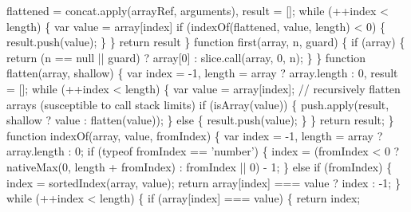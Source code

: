\begin{DoxyCodeInclude}
{{\textcolor{stringliteral}{        flattened = concat.apply(arrayRef, arguments),}
\textcolor{stringliteral}{        result = [];}
\textcolor{stringliteral}{}
\textcolor{stringliteral}{    while (++index < length) \{}
\textcolor{stringliteral}{      var value = array[index]}
\textcolor{stringliteral}{      if (indexOf(flattened, value, length) < 0) \{}
\textcolor{stringliteral}{        result.push(value);}
\textcolor{stringliteral}{      \}}
\textcolor{stringliteral}{    \}}
\textcolor{stringliteral}{    return result}
\textcolor{stringliteral}{  \}}
\textcolor{stringliteral}{}
\textcolor{stringliteral}{  function first(array, n, guard) \{}
\textcolor{stringliteral}{    if (array) \{}
\textcolor{stringliteral}{      return (n == null || guard) ? array[0] : slice.call(array, 0, n);}
\textcolor{stringliteral}{    \}}
\textcolor{stringliteral}{  \}}
\textcolor{stringliteral}{}
\textcolor{stringliteral}{  function flatten(array, shallow) \{}
\textcolor{stringliteral}{    var index = -1,}
\textcolor{stringliteral}{        length = array ? array.length : 0,}
\textcolor{stringliteral}{        result = [];}
\textcolor{stringliteral}{}
\textcolor{stringliteral}{    while (++index < length) \{}
\textcolor{stringliteral}{      var value = array[index];}
\textcolor{stringliteral}{}
\textcolor{stringliteral}{      // recursively flatten arrays (susceptible to call stack limits)}
\textcolor{stringliteral}{      if (isArray(value)) \{}
\textcolor{stringliteral}{        push.apply(result, shallow ? value : flatten(value));}
\textcolor{stringliteral}{      \} else \{}
\textcolor{stringliteral}{        result.push(value);}
\textcolor{stringliteral}{      \}}
\textcolor{stringliteral}{    \}}
\textcolor{stringliteral}{    return result;}
\textcolor{stringliteral}{  \}}
\textcolor{stringliteral}{}
\textcolor{stringliteral}{  function indexOf(array, value, fromIndex) \{}
\textcolor{stringliteral}{    var index = -1,}
\textcolor{stringliteral}{        length = array ? array.length : 0;}
\textcolor{stringliteral}{}
\textcolor{stringliteral}{    if (typeof fromIndex == 'number') \{}
\textcolor{stringliteral}{      index = (fromIndex < 0 ? nativeMax(0, length + fromIndex) : fromIndex || 0) - 1;}
\textcolor{stringliteral}{    \} else if (fromIndex) \{}
\textcolor{stringliteral}{      index = sortedIndex(array, value);}
\textcolor{stringliteral}{      return array[index] === value ? index : -1;}
\textcolor{stringliteral}{    \}}
\textcolor{stringliteral}{    while (++index < length) \{}
\textcolor{stringliteral}{      if (array[index] === value) \{}
\textcolor{stringliteral}{        return index;}
}}
\end{DoxyCodeInclude}
